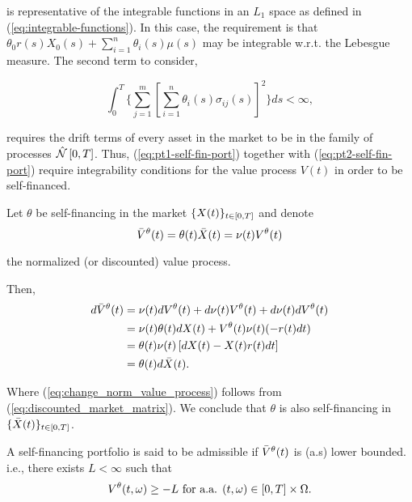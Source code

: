 \documentclass[../TGMAFFIRO.tex]{subfiles}
\begin{document}
is representative of the integrable functions in an $L_1$ space as defined in (\ref{eq:integrable-functions}). In this case, the requirement is that $\theta_0r(s)X_0(s) + \sum_{i=1}^{n}\theta_i(s)\mu(s)$ may be integrable w.r.t. the Lebesgue measure. The second term to consider,

\begin{equation} \label{eq:pt2-self-fin-port}
\int_0^T\{\sum_{j=1}^m\left[\sum_{i=1}^n\theta_i(s)\sigma_{ij}(s)\right]^2\} ds < \infty,
\end{equation}

requires the drift terms of every asset in the market to be in the family of processes $\hat{\mathcal{N}}\left[0, T\right]$. Thus, (\ref{eq:pt1-self-fin-port}) together with (\ref{eq:pt2-self-fin-port}) require integrability conditions for the value process $V(t)$ in order to be self-financed. 

\begin{remark}
	Let $\theta$ be self-financing in the market $\{X(t)\}_{t\in[0,T]}$ and denote
	\begin{equation}
		\bar{V}^\theta(t) = \theta(t)\bar X(t) = \nu(t) V^\theta(t)
	\end{equation}
	
the normalized (or discounted) value process.

Then,
\begin{align}
	d\bar{V}^\theta(t	) &= \nu(t) dV^\theta(t) + d\nu(t) V^\theta(t) + d\nu(t) dV^\theta(t)\nonumber\\
	&= \nu(t)\theta(t)dX(t) + V^\theta(t)\nu(t)(-r(t)dt)\nonumber\\
	&= \theta(t)\nu(t)\left[dX(t) - X(t)r(t)dt\right]\nonumber\\
	&= \theta(t)d\bar{X}(t).\label{eq:change_norm_value_process}
\end{align}

Where (\ref{eq:change_norm_value_process}) follows from (\ref{eq:discounted_market_matrix}). We conclude that $\theta$ is also self-financing in $\{\bar{X}(t)\}_{t\in[0,T]}$.
\end{remark}


\begin{definition}
	A self-financing portfolio is said to be admissible if $\bar{V}^\theta(t)$ is (a.s) lower bounded. i.e., there exists $L < \infty$ such that
	\begin{equation}
		V^\theta(t, \omega)  \geq -L \ \text{for a.a. } (t,\omega) \in [0,T]\times \Omega.
	\end{equation}
\end{definition}
\end{document}

